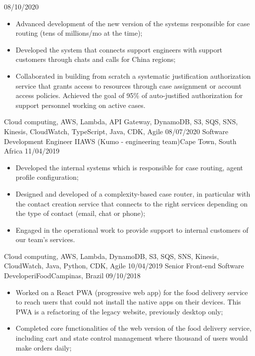 \begin{experiences}
    {08/10/2020} {
    \begin{itemize}
      \item Advanced development of the new version of the systems responsible for case routing (tens of millions/mo at the time);
      \item Developed the system that connects support engineers with support customers through chats and calls for China regions;
      \item Collaborated in building from scratch a systematic justification authorization service that grants access to resources through case assignment or account access policies. Achieved the goal of 95\% of auto-justified authorization for support personnel working on active cases.
    \end{itemize}
  }
  {Cloud computing, AWS, Lambda, API Gateway, DynamoDB, S3, SQS, SNS, Kinesis, CloudWatch, TypeScript, Java, CDK, Agile }
  \emptySeparator
  \experience
    {08/07/2020}   {Software Development Engineer II}{AWS (Kumo - engineering team)}{Cape Town, South Africa}
    {11/04/2019} {
    \begin{itemize}
      \item Developed the internal systems which is responsible for case routing, agent profile configuration;
      \item Designed and developed of a complexity-based case router, in particular with the contact creation service that connects to the right services depending on the type of contact (email, chat or phone);
      \item Engaged in the operational work to provide support to internal customers of our team's services.
    \end{itemize}
  }
  {Cloud computing, AWS, Lambda, DynamoDB, S3, SQS, SNS, Kinesis, CloudWatch, Java, Python, CDK, Agile }
  \emptySeparator
  \experience
  {10/04/2019}   {Senior Front-end Software Developer}{iFood}{Campinas, Brazil}
  {09/10/2018} {
  \begin{itemize}
    \item Worked on a React PWA (progressive web app) for the food delivery service to reach users that could not install the native apps on their devices. This PWA is a refactoring of the legacy website, previously desktop only;
    \item Completed core functionalities of the web version of the food delivery service, including cart and state control management where thousand of users would make orders daily;
  \end{itemize}
}
\end{experiences}
